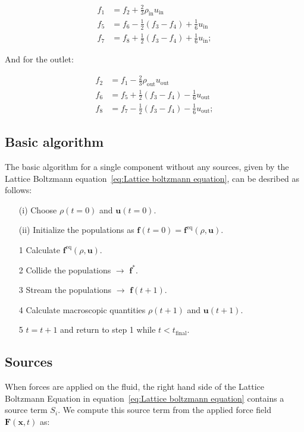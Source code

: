 \begin{equation}
\begin{split}
    f_1 &= f_2 + \frac{2}{3}\rho_{\text{in}}u_{\text{in}}\\
    f_5 &= f_6 - \frac{1}{2}\left(f_3 - f_4\right) + \frac{1}{6}u_{\text{in}}\\
    f_7 &= f_8 + \frac{1}{2}\left(f_3 - f_4\right) + \frac{1}{6}u_{\text{in}};
\end{split}
\end{equation}

And for the outlet:

\begin{equation}
\begin{split}
    f_2 &= f_1 - \frac{2}{3}\rho_{\text{out}}u_{\text{out}}\\
    f_6 &= f_5 + \frac{1}{2}\left(f_3 - f_4\right) - \frac{1}{6}u_{\text{out}}\\
    f_8 &= f_7 - \frac{1}{2}\left(f_3 - f_4\right) - \frac{1}{6}u_{\text{out}};
\end{split}
\end{equation}

\subsection{Basic algorithm}\label{subsec:Basic algorithm}
The basic algorithm for a single component without any sources, given by the Lattice Boltzmann equation~\ref{eq:Lattice boltzmann equation}, can be desribed as follows:

\begin{itemize}\label{it:Basic algorithm}
    \item[(i)] Choose $\rho(t=0)$ and $\bm{u}(t=0)$.
    \item[(ii)] Initialize the populations as $\bm{f}(t=0) = \bm{f}^{\text{eq}}(\rho, \bm{u})$. 
    \item[1] Calculate $\bm{f}^{\text{eq}}(\rho, \bm{u})$.
    \item[2] Collide the populations $\rightarrow$ $\bm{f}^*$.
    \item[3] Stream the populations $\rightarrow$ $\bm{f}(t + 1)$.
    \item[4] Calculate macroscopic quantities $\rho(t + 1)$ and $\bm{u}(t + 1)$.
    \item[5] $t = t + 1$ and return to step 1 while $t < t_{\text{final}}$.
\end{itemize}

\subsection{Sources}
When forces are applied on the fluid, the right hand side of the Lattice Boltzmann Equation in equation~\ref{eq:Lattice boltzmann equation} contains a source term $S_i$. We compute this source term from the applied force field $\bm{F}(\bm{x}, t)$ as:

